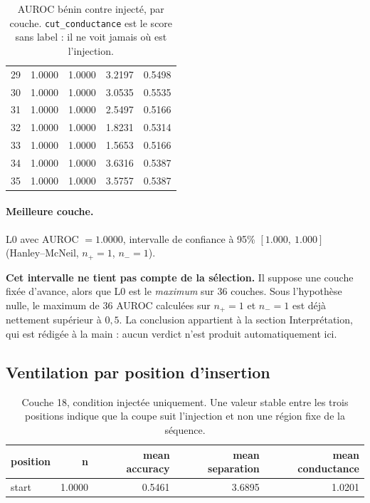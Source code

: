 \documentclass[11pt,a4paper]{article}
\begin{document}
\begin{table}[htbp]
\begin{tabular}{lrrrr}
29 & 1.0000 & 1.0000 & 3.2197 & 0.5498 \\
30 & 1.0000 & 1.0000 & 3.0535 & 0.5535 \\
31 & 1.0000 & 1.0000 & 2.5497 & 0.5166 \\
32 & 1.0000 & 1.0000 & 1.8231 & 0.5314 \\
33 & 1.0000 & 1.0000 & 1.5653 & 0.5166 \\
34 & 1.0000 & 1.0000 & 3.6316 & 0.5387 \\
35 & 1.0000 & 1.0000 & 3.5757 & 0.5387 \\
\hline
\end{tabular}
\caption{AUROC bénin contre injecté, par couche. \texttt{cut\_conductance} est le score sans label : il ne voit jamais où est l'injection.}
\label{tab:layers}
\end{table}


\paragraph{Meilleure couche.} L0 avec
AUROC $= 1.0000$, intervalle de confiance à 95\%
$[1.000,\ 1.000]$ (Hanley--McNeil, $n_+ = 1$, $n_- = 1$).



\textbf{Cet intervalle ne tient pas compte de la sélection.} Il suppose une
couche fixée d'avance, alors que L0 est le \emph{maximum} sur
36 couches. Sous l'hypothèse nulle, le maximum de
36 AUROC calculées sur $n_+ = 1$ et $n_- = 1$ est déjà
nettement supérieur à $0{,}5$. La conclusion appartient à la section
Interprétation, qui est rédigée à la main : aucun verdict n'est produit
automatiquement ici.


\subsection{Ventilation par position d'insertion}

\begin{table}[htbp]
\centering
\small
\begin{tabular}{lrrrr}
\hline
position & n & mean accuracy & mean separation & mean conductance \\
\hline
start & 1.0000 & 0.5461 & 3.6895 & 1.0201 \\
\hline
\end{tabular}
\caption{Couche 18, condition injectée uniquement. Une valeur stable entre les trois positions indique que la coupe suit l'injection et non une région fixe de la séquence.}
\label{tab:positions}
\end{table}
\end{document}
